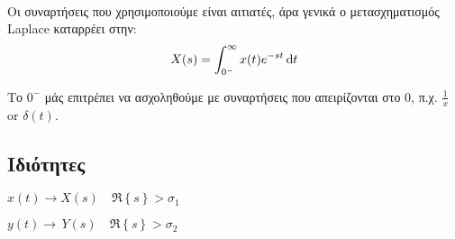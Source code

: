 \documentclass[11pt,a4paper,titlepage,fleqn]{article}
\begin{document}
	\paragraph{}
	Οι συναρτήσεις που χρησιμοποιούμε είναι αιτιατές, άρα γενικά ο μετασχηματισμός
	Laplace καταρρέει στην:
	\[
	X(s) = \int_{0^-}^{\infty} x(t)e^{-st}\dif t
	\]
	
	Το \( 0^- \) μάς επιτρέπει να ασχοληθούμε με συναρτήσεις που απειρίζονται
	στο 0, π.χ. \( \frac{1}{x} \) or \( \delta(t) \).
	
	\subsection{Ιδιότητες}
	\( x(t)\to X(s) \quad \Re\left\lbrace s \right\rbrace > \sigma_1 \)
	
	\( y(t)\to\, Y(s) \quad \Re\left\lbrace s \right\rbrace > \sigma_2 \)
	
\end{document}
